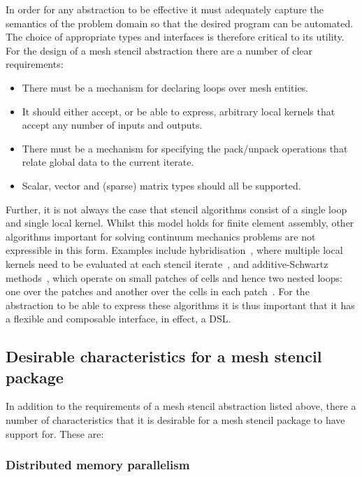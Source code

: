 \documentclass[thesis]{subfiles}
\begin{document}
In order for any abstraction to be effective it must adequately capture the semantics of the problem domain so that the desired program can be automated.
The choice of appropriate types and interfaces is therefore critical to its utility.
For the design of a mesh stencil abstraction there are a number of clear requirements:
\begin{itemize}
  \item There must be a mechanism for declaring loops over mesh entities.
  \item It should either accept, or be able to express, arbitrary local kernels that accept any number of inputs and outputs.
  \item There must be a mechanism for specifying the pack/unpack operations that relate global data to the current iterate.
  \item Scalar, vector and (sparse) matrix types should all be supported.
\end{itemize}

Further, it is not always the case that stencil algorithms consist of a single loop and single local kernel.
Whilst this model holds for finite element assembly, other algorithms important for solving continuum mechanics problems are not expressible in this form.
Examples include hybridisation~\cite{arnoldMixedNonconformingFinite1985,boffi2013mixed}, where multiple local kernels need to be evaluated at each stencil iterate~\cite{gibsonSlateExtendingFiredrake2020}, and additive-Schwartz methods~\cite{arnoldPreconditioningHdivApplications1997}, which operate on small patches of cells and hence two nested loops: one over the patches and another over the cells in each patch~\cite{farrellPCPATCHSoftwareTopological2021}.
For the abstraction to be able to express these algorithms it is thus important that it has a flexible and composable interface, in effect, a DSL.

\subsection{Desirable characteristics for a mesh stencil package}
\label{sec:intro_desirable_traits}

In addition to the requirements of a mesh stencil abstraction listed above, there a number of characteristics that it is desirable for a mesh stencil package to have support for.
These are:

\subsubsection{Distributed memory parallelism}
\label{sec:intro_parallelism}
\end{document}
